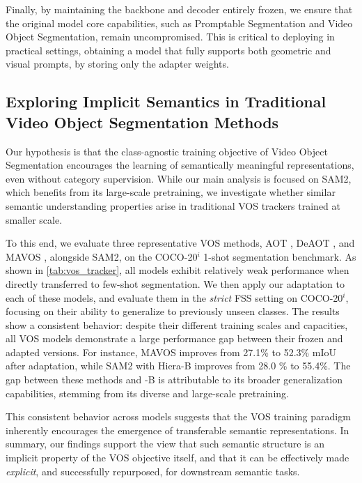 Finally, by maintaining the \sam{} backbone and decoder entirely frozen, we ensure that the original model core capabilities, such as Promptable Segmentation and Video Object Segmentation, remain uncompromised. This is critical to deploying \ours{} in practical settings, obtaining a model that fully supports both geometric and visual prompts, by storing only the adapter weights.

\subsection{Exploring Implicit Semantics in Traditional Video Object Segmentation Methods}
Our hypothesis is that the class-agnostic training objective of Video Object Segmentation encourages the learning of semantically meaningful representations, even without category supervision. While our main analysis is focused on SAM2, which benefits from its large-scale pretraining, we investigate whether similar semantic understanding properties arise in traditional VOS trackers trained at smaller scale.

To this end, we evaluate three representative VOS methods, AOT \cite{yang2021associating}, DeAOT \cite{yang2022decoupling}, and MAVOS \cite{shaker2024efficient}, alongside SAM2, on the COCO-20$^i$ 1-shot segmentation benchmark. As shown in \cref{tab:vos_tracker}, all models exhibit relatively weak performance when directly transferred to few-shot segmentation.
We then apply our adaptation to each of these models, and evaluate them in the \textit{strict} FSS setting on COCO-20$^i$, \ie focusing on their ability to generalize to previously unseen classes.
The results show a consistent behavior: despite their different training scales and capacities, all VOS models demonstrate a large performance gap between their frozen and adapted versions. For instance, MAVOS improves from 27.1\% to 52.3\% mIoU after adaptation, while SAM2 with Hiera-B improves from 28.0 \% to 55.4\%.
The gap between these methods and \sam{}-B is attributable to its broader generalization capabilities, stemming from its diverse and large-scale pretraining.



This consistent behavior across models suggests that the VOS training paradigm inherently encourages the emergence of transferable semantic representations. In summary, our findings support the view that such semantic structure is an implicit property of the VOS objective itself, and that it can be effectively made \textit{explicit}, and successfully repurposed, for downstream semantic tasks.


